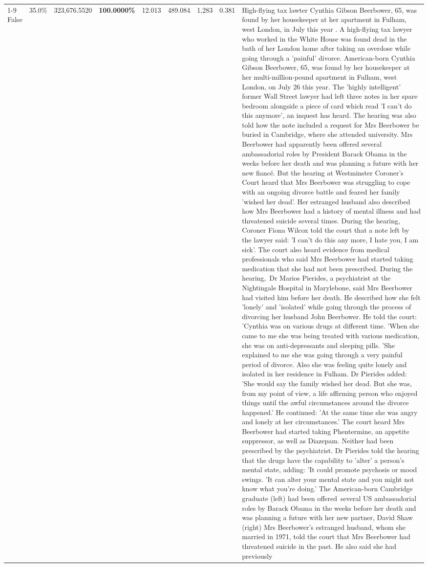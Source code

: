 \begin{table}[H]
\begin{tabular}{lllrlllll}
\cline{1-9}
False & 35.0\% & 323,676.5520 & \bfseries \color{red} 100.0000\% & 12.013 & 489.084 & 1,283 & 0.381 & High-flying tax lawter Cynthia Gibson Beerbower, 65, was found by her housekeeper at her apartment in Fulham, west London, in July this year . A high-flying tax lawyer who worked in the White House was found dead in the bath of her London home after taking an overdose while going through a 'painful' divorce. American-born Cynthia Gibson Beerbower, 65, was found by her housekeeper at her multi-million-pound apartment in Fulham, west London, on July 26 this year. The 'highly intelligent' former Wall Street lawyer had left three notes in her spare bedroom alongside a piece of card which read 'I can't do this anymore', an inquest has heard. The hearing was also told how the note included a request for Mrs Beerbower be buried in Cambridge, where she attended university. Mrs Beerbower had apparently been offered several ambassadorial roles by President Barack Obama in the weeks before her death and was planning a future with her new fiancé. But the hearing at Westminster Coroner's Court heard that Mrs Beerbower was struggling to cope with an ongoing divorce battle and feared her family 'wished her dead'. Her estranged husband also described how Mrs Beerbower had a history of mental illness and had threatened suicide several times. During the hearing, Coroner Fiona Wilcox told the court that a note left by the lawyer said: 'I can't do this any more, I hate you, I am sick'. The court also heard evidence from medical professionals who said Mrs Beerbower had started taking medication that she had not been prescribed. During the hearing, Dr Marios Pierides, a psychiatrist at the Nightingale Hospital in Marylebone, said Mrs Beerbower had visited him before her death. He described how she felt 'lonely' and 'isolated' while going through the process of divorcing her husband John Beerbower. He told the court: 'Cynthia was on various drugs at different time. 'When she came to me she was being treated with various medication, she was on anti-depressants and sleeping pills. 'She explained to me she was going through a very painful period of divorce. Also she was feeling quite lonely and isolated in her residence in Fulham. Dr Pierides added: 'She would say the family wished her dead. But she was, from my point of view, a life affirming person who enjoyed things until the awful circumstances around the divorce happened.' He continued: 'At the same time she was angry and lonely at her circumstances.' The court heard Mrs Beerbower had started taking Phentermine, an appetite suppressor, as well as Diazepam. Neither had been prescribed by the psychiatrist. Dr Pierides told the hearing that the drugs have the capability to 'alter' a person's mental state, adding: 'It could promote psychosis or mood swings. 'It can alter your mental state and you might not know what you're doing.' The American-born Cambridge graduate (left) had been offered several US ambassadorial roles by Barack Obama in the weeks before her death and was planning a future with her new partner, David Shaw (right) Mrs Beerbower's estranged husband, whom she married in 1971, told the court that Mrs Beerbower had threatened suicide in the past. He also said she had previously 
\end{tabular}
\end{table}
